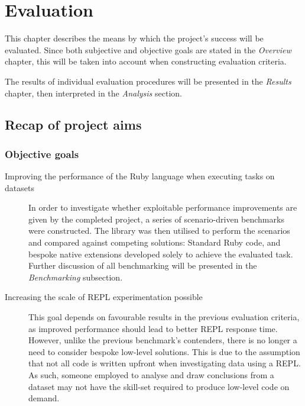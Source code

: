 \chapter{Evaluation}
This chapter describes the means by which the project's success will be evaluated.
Since both subjective and objective goals are stated in the \emph{Overview} chapter, this will be taken into account when constructing evaluation criteria.

The results of individual evaluation procedures will be presented in the \emph{Results} chapter, then interpreted in the \emph{Analysis} section.

\section{Recap of project aims}
\subsection{Objective goals}
\begin{description}
\item[Improving the performance of the Ruby language when executing tasks on datasets]
In order to investigate whether exploitable performance improvements are given by the completed project, a series of scenario-driven benchmarks were constructed.
The library was then utilised to perform the scenarios and compared against competing solutions: Standard Ruby code, and bespoke native extensions developed solely to achieve the evaluated task.
Further discussion of all benchmarking will be presented in the \emph{Benchmarking} subsection.
\item[Increasing the scale of \ac{REPL} experimentation possible]
This goal depends on favourable results in the previous evaluation criteria, as improved performance should lead to better \ac{REPL} response time. However, unlike the previous benchmark's contenders, there is no longer a need to consider bespoke low-level solutions. This is due to the assumption that not all code is written upfront when investigating data using a \ac{REPL}. As such, someone employed to analyse and draw conclusions from a dataset may not have the skill-set required to produce low-level code on demand.
\end{description}

